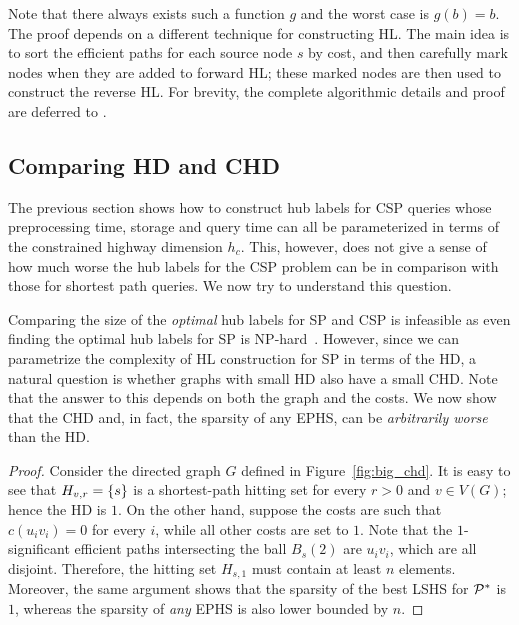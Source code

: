 Note that there always exists such a function $g$ and the worst case is $g(b)=b$.
The proof depends on a different technique for constructing HL.
The main idea is to sort the efficient paths for each source node $s$ by cost, and then carefully mark nodes when they are added to forward HL; these marked nodes are then used to construct the reverse HL.
For brevity, the complete algorithmic details and proof are deferred to \cite{TechReport}.

\subsection{Comparing HD and CHD}
\label{ssec:hdvschd}

The previous section shows how to construct hub labels for CSP queries whose preprocessing time, storage and query time can all be parameterized in terms of the constrained highway dimension $h_c$. 
This, however, does not give a sense of how much worse the hub labels for the CSP problem can be in comparison with those for shortest path queries. 
We now try to understand this question.


Comparing the size of the \emph{optimal} hub labels for SP and CSP is infeasible as even finding the optimal hub labels for SP is NP-hard~\cite{babenko_hl_complexity}. 
However, since we can parametrize the complexity of HL construction for SP in terms of the HD, a natural question is whether graphs with small HD also have a small CHD. 
Note that the answer to this depends on both the graph and the costs.
We now show that the CHD and, in fact, the sparsity of any EPHS, can be \emph{arbitrarily worse} than the HD. 

\begin{proof}
	Consider the directed graph $G$ defined in Figure~\ref{fig:big_chd}.
	It is easy to see that $H_{v,r}=\{s\}$ is a shortest-path hitting set for every $r>0$ and $v\in V(G)$; hence the HD is $1$.
	On the other hand, suppose the costs are such that $c(u_iv_i)=0$ for every $i$, while all other costs are set to $1$.
	Note that the $1$-significant efficient paths intersecting the ball $B_s(2)$ are $u_iv_i$, which are all disjoint.
	Therefore, the hitting set $H_{s,1}$ must contain at least $n$ elements. Moreover, the same argument shows that the sparsity of the best LSHS for $\mathcal{P}^*$ is $1$, whereas the sparsity of \emph{any} EPHS is also lower bounded by $n$.
\end{proof}

